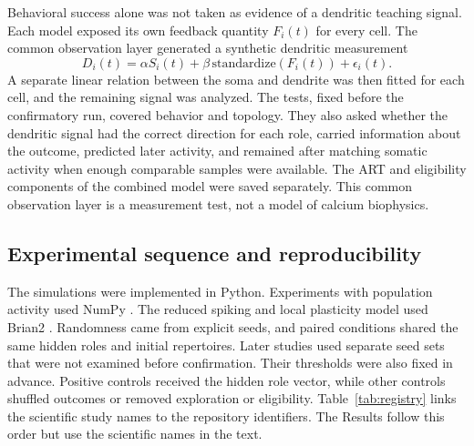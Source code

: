 \documentclass[11pt]{article}
\begin{document}
Behavioral success alone was not taken as evidence of a dendritic teaching signal. Each model exposed its own feedback quantity $F_i(t)$ for every cell. The common observation layer generated a synthetic dendritic measurement
\begin{equation}
D_i(t)=\alpha S_i(t)+\beta\,\mathrm{standardize}\!\left(F_i(t)\right)+\epsilon_i(t).
\end{equation}
A separate linear relation between the soma and dendrite was then fitted for each cell, and the remaining signal was analyzed. The tests, fixed before the confirmatory run, covered behavior and topology. They also asked whether the dendritic signal had the correct direction for each role, carried information about the outcome, predicted later activity, and remained after matching somatic activity when enough comparable samples were available. The ART and eligibility components of the combined model were saved separately. This common observation layer is a measurement test, not a model of calcium biophysics.

\subsection{Experimental sequence and reproducibility}
The simulations were implemented in Python. Experiments with population activity used NumPy \citep{harris2020}. The reduced spiking and local plasticity model used Brian2 \citep{stimberg2019}. Randomness came from explicit seeds, and paired conditions shared the same hidden roles and initial repertoires. Later studies used separate seed sets that were not examined before confirmation. Their thresholds were also fixed in advance. Positive controls received the hidden role vector, while other controls shuffled outcomes or removed exploration or eligibility. Table~\ref{tab:registry} links the scientific study names to the repository identifiers. The Results follow this order but use the scientific names in the text.
\end{document}
